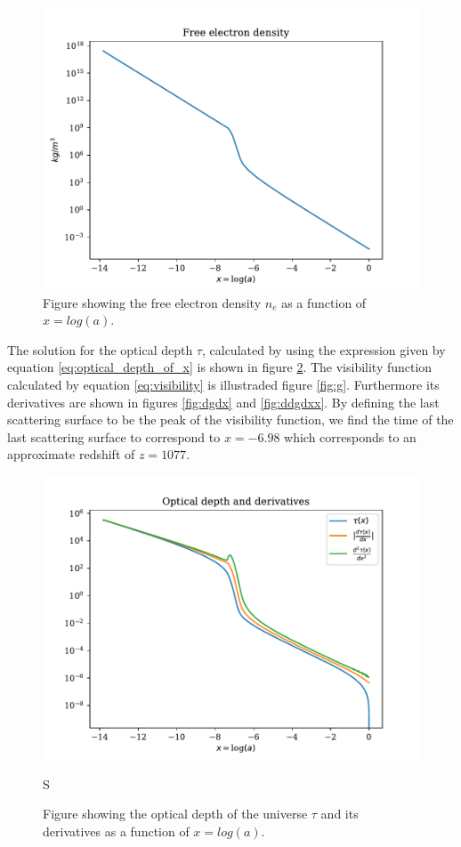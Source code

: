 \documentclass[onecolumn]{aastex62}
\begin{document}
\begin{figure}
    \includegraphics[scale=0.8]{figures/ne.pdf}
    \caption{Figure showing the free electron density $n_e$ as a function of $x=log(a)$.}
    \label{fig:ne}
\end{figure}
The solution for the optical depth $\tau$, calculated by using the expression given by equation \ref{eq:optical_depth_of_x} is shown in figure \ref{fig:tau}.
The visibility function calculated by equation \ref{eq:visibility} is illustraded figure \ref{fig:g}. Furthermore its derivatives are shown in figures \ref{fig:dgdx} and \ref{fig:ddgdxx}.
By defining the last scattering surface to be the peak of the visibility function, we find the time of the last scattering surface to correspond to $x=-6.98$ which corresponds to an approximate redshift of $z=1077$.
\begin{figure}
    \includegraphics[scale=0.8]{figures/tau.pdf}
    \caption{Figure showing the optical depth of the universe $\tau$ and its derivatives as a function of $x=log(a)$.}S
    \label{fig:tau}
\end{figure}
\end{document}
